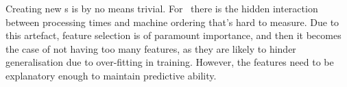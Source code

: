 \documentclass[smallextended]{svjour3}
\begin{document}
	Creating new \dr s is by no means trivial. For \jsp\ there is 
	the hidden interaction between processing times and machine ordering that's 
	hard to measure.
	Due to this artefact, feature selection is of paramount importance, and then it 
	becomes the case of not having too many features, as they are likely to hinder 
	generalisation due to over-fitting in training. However, the features need to 
	be explanatory enough to maintain predictive ability. 
	
\end{document}
